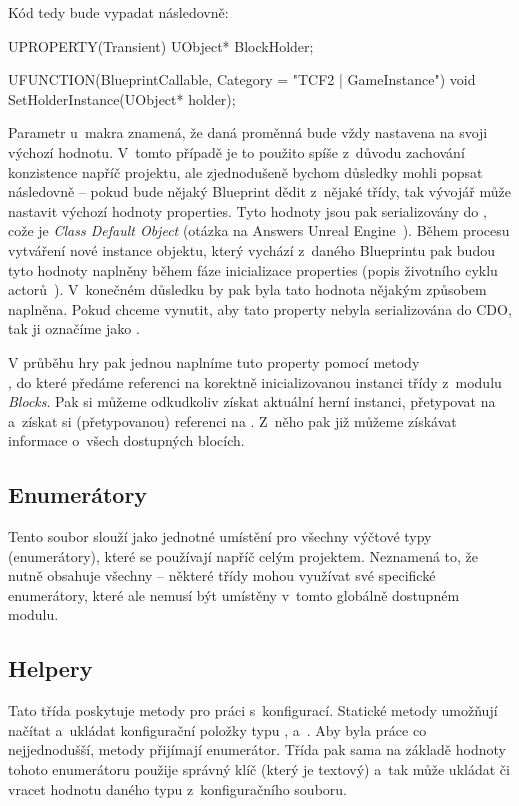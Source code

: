 Kód tedy bude vypadat následovně:
\begin{code}
	UPROPERTY(Transient)
		UObject* BlockHolder;

	UFUNCTION(BlueprintCallable, Category = "TCF2 | GameInstance")
		void SetHolderInstance(UObject* holder);
\end{code}



 Parametr  u~makra  znamená, že daná proměnná bude vždy nastavena na svoji výchozí hodnotu. V~tomto případě je to použito spíše z~důvodu zachování konzistence napříč projektu, ale zjednodušeně bychom důsledky mohli popsat následovně -- pokud bude nějaký Blueprint dědit z~nějaké \CPP{} třídy, tak vývojář může nastavit výchozí hodnoty properties. Tyto hodnoty jsou pak serializovány do \CDO{}, cože je \textit{Class Default Object} (otázka na Answers Unreal Engine~\citep{ue_cdo}). Během procesu vytváření nové instance objektu, který vychází z~daného Blueprintu pak budou tyto hodnoty naplněny během fáze inicializace properties (popis životního cyklu actorů~\citep{ue_actor_life}). V~konečném důsledku by pak byla tato hodnota nějakým způsobem naplněna. Pokud chceme vynutit, aby tato property nebyla serializována do CDO, tak ji označíme jako .

V průběhu hry pak jednou naplníme tuto property pomocí metody\\ , do které předáme referenci na korektně inicializovanou instanci třídy  z~modulu \textit{Blocks}. Pak si můžeme odkudkoliv získat aktuální herní instanci, přetypovat na  a~získat si (přetypovanou) referenci na . Z~něho pak již můžeme získávat informace o~všech dostupných blocích.

\subsection{Enumerátory}

Tento soubor slouží jako jednotné umístění pro všechny výčtové typy (enumerátory), které se používají napříč celým projektem. Neznamená to, že nutně obsahuje všechny -- některé třídy mohou využívat své specifické enumerátory, které ale nemusí být umístěny v~tomto globálně dostupném modulu.


\subsection{Helpery}

 Tato třída poskytuje metody pro práci s~konfigurací. Statické metody umožňují načítat a~ukládat konfigurační položky typu ,  a~.
Aby byla práce co nejjednodušší, metody přijímají enumerátor\linebreak[4]. Třída pak sama na základě hodnoty tohoto enumerátoru použije správný klíč (který je textový) a~tak může ukládat či vracet hodnotu daného typu z~konfiguračního souboru.